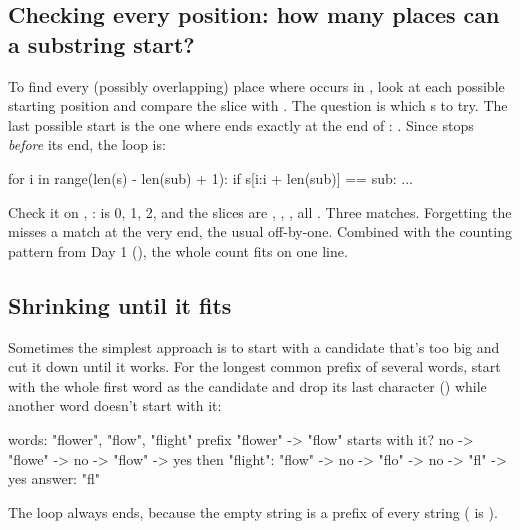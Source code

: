 \documentclass[10pt,a4paper]{article}
\begin{document}
\subsection{Checking every position: how many places can a substring start?}
To find every (possibly overlapping) place where  occurs in , look at each possible starting position  and compare the slice  with . The question is which s to try. The last possible start is the one where  ends exactly at the end of : . Since  stops \emph{before} its end, the loop is:
\begin{pycode}
for i in range(len(s) - len(sub) + 1):
    if s[i:i + len(sub)] == sub:
        ...
\end{pycode}
Check it on , :  is 0, 1, 2, and the slices are , , , all . Three matches. Forgetting the  misses a match at the very end, the usual off-by-one.
Combined with the counting pattern from Day 1 (), the whole count fits on one line.
\subsection{Shrinking until it fits}
Sometimes the simplest approach is to start with a candidate that’s too big and cut it down until it works. For the longest common prefix of several words, start with the whole first word as the candidate and drop its last character () while another word doesn’t start with it:
\begin{txtcode}
words: "flower", "flow", "flight"
prefix "flower" -> "flow" starts with it? no -> "flowe" -> no -> "flow" -> yes
then "flight": "flow" -> no -> "flo" -> no -> "fl" -> yes
answer: "fl"
\end{txtcode}
The loop always ends, because the empty string \code{\textquotedbl{}\textquotedbl{}} is a prefix of every string ( is ).
\end{document}
